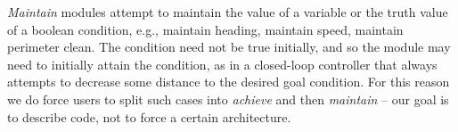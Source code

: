 \documentclass[ 5p, 12pt, times, twocolumn, sort&compress ]{elsarticle}
\begin{document}
%

{\em Maintain\/} modules attempt to maintain the value of a variable or the truth value of a boolean condition,
e.g., maintain heading, maintain speed, maintain perimeter clean. The condition need not be true initially, 
and so the module may need to initially attain the condition, as in a closed-loop controller that always attempts to
decrease some distance to the desired goal condition. For this reason we do force users to split such
cases into {\em achieve} and then {\em maintain} -- our goal is to describe code, not to force a certain architecture.  
\end{document}
